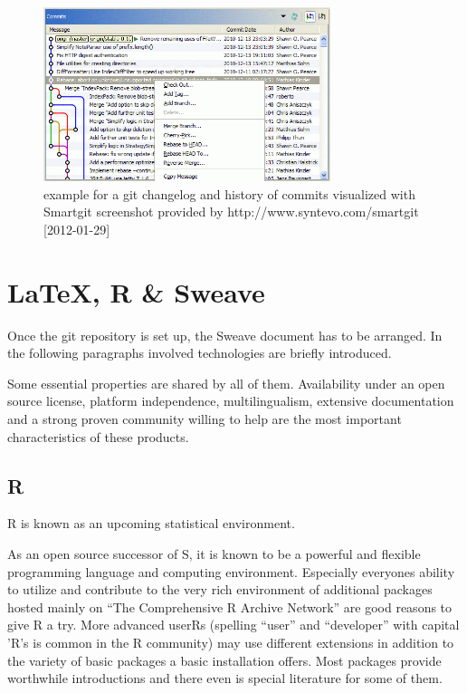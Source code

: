 \documentclass{ifacconf}
\begin{document}
\begin{figure}[h]
\begin{center}
\includegraphics[width=8.4cm]{pics/Smartgit_graphical_Log.png}    %
\caption{example for a git changelog and history of commits visualized with Smartgit \newline 
screenshot provided by http://www.syntevo.com/smartgit [2012-01-29]} 
\label{fig:gitHistory}
\end{center}
\end{figure}

\section{\LaTeX, R \& Sweave}\label{sec:structure}

Once the git repository is set up, the Sweave document has to be arranged. 
In the following paragraphs involved technologies are briefly introduced.

Some essential properties are shared by all of them. Availability under an open source license, 
platform independence, multilingualism, extensive documentation and a strong proven 
community willing to help are the most important characteristics of these products.


\subsection{R}
R \citep{R} is known as an upcoming statistical environment. 

As an open source successor of S, it is known to be a powerful and flexible programming language
and computing environment. Especially everyones ability to utilize and
contribute to the very rich environment of additional packages hosted 
mainly on “The Comprehensive R Archive Network” are good reasons to give R a try. 
More advanced userRs (spelling “user” and “developer” with capital
’R’s is common in the R community) may use different extensions in 
addition to the variety of basic packages a basic installation offers.
Most packages provide worthwhile introductions and there even is special literature
for some of them.
\end{document}
